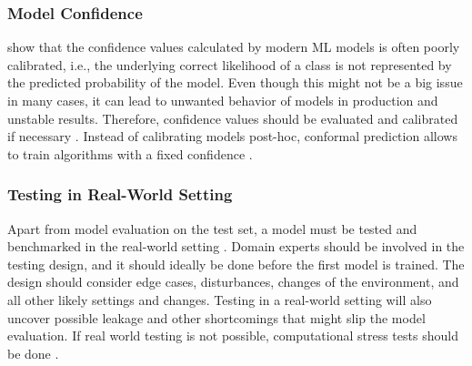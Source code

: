 \subsubsection{Model Confidence}
\citet{Guo2017_Calibration} show that the confidence values calculated by modern \ac{ML} models is often poorly calibrated, i.e., the underlying correct likelihood of a  class is not represented by the predicted probability of the model. Even though this might not be a big issue in many cases, it can lead to unwanted behavior of models in production and unstable results. Therefore, confidence values should be evaluated and calibrated if necessary \citep{Guo2017_Calibration, abdar2021_uncertainty}. 
Instead of calibrating models post-hoc, conformal prediction allows to train algorithms with a fixed confidence \citep{shafer2008tutorial}.

\subsubsection{Testing in Real-World Setting}
Apart from model evaluation on the test set, a model must be tested and benchmarked in the real-world setting \citep{Arp_DosDonts, larson2021_regulatory}. Domain experts should be involved in the testing design, and it should ideally be done before the first model is trained. %
The design should consider edge cases, disturbances, changes of the environment, and all other likely settings and changes. Testing in a real-world setting will also uncover possible leakage and other shortcomings that might slip the model evaluation. %
If real world testing is not possible, computational stress tests should be done \citep{young2021_stresstest}.


